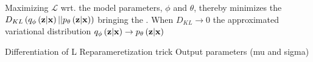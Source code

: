 Maximizing $\mathcal{L}$ wrt. the model parameters, $\phi$ and $\theta$, thereby minimizes the $D_{KL}\left( q_{\phi}\left(\bm{\mathrm{z}}|\bm{\mathrm{x}}\right)||p_{\theta}\left(\bm{\mathrm{z}}|\bm{\mathrm{x}}\right)\right)$ bringing the . When $D_{KL}\rightarrow 0$ the approximated variational distribution $q_{\phi}\left(\bm{\mathrm{z}}|\bm{\mathrm{x}}\right)\rightarrow p_{\theta}\left(\bm{\mathrm{z}}|\bm{\mathrm{x}}\right)$

Differentiation of L
Reparameretization trick
Output parameters (mu and sigma)